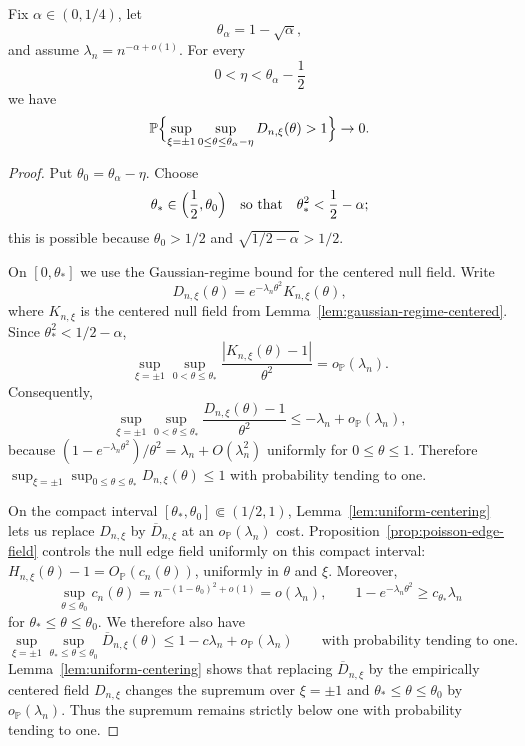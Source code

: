 \begin{lemma}
\label{lem:subthreshold-envelope}
Fix $\alpha\in(0,1/4)$, let
\[
    \theta_\alpha=1-\sqrt\alpha,
\]
and assume $\lambda_n=n^{-\alpha+o(1)}$. For every
\[
    0<\eta<\theta_\alpha-\frac12
\]
we have
\[
    \mathbb P\Bigl\{
        \sup_{\xi=\pm1}
        \sup_{0\le\theta\le\theta_\alpha-\eta}
        D_{n,\xi}(\theta)>1
    \Bigr\}\to0.
\]
\end{lemma}

\begin{proof}
Put $\theta_0=\theta_\alpha-\eta$. Choose
\[
    \theta_* \in
    \Bigl(\frac12,\theta_0\Bigr)
    \quad\text{so that}\quad
    \theta_*^2<\frac12-\alpha;
\]
this is possible because $\theta_0>1/2$ and $\sqrt{1/2-\alpha}>1/2$.

On $[0,\theta_*]$ we use the Gaussian-regime bound for the centered null field. Write
\[
    D_{n,\xi}(\theta)
    =
    e^{-\lambda_n\theta^2}K_{n,\xi}(\theta),
\]
where $K_{n,\xi}$ is the centered null field from Lemma~\ref{lem:gaussian-regime-centered}. Since $\theta_*^2<1/2-\alpha$,
\[
    \sup_{\xi=\pm1}\sup_{0<\theta\le\theta_*}
    \frac{|K_{n,\xi}(\theta)-1|}{\theta^2}
    =
    o_{\mathbb P}(\lambda_n).
\]
Consequently,
\[
    \sup_{\xi=\pm1}\sup_{0<\theta\le\theta_*}
    \frac{D_{n,\xi}(\theta)-1}{\theta^2}
    \le
    -\lambda_n+o_{\mathbb P}(\lambda_n),
\]
because $(1-e^{-\lambda_n\theta^2})/\theta^2=\lambda_n+O(\lambda_n^2)$ uniformly for $0\le\theta\le1$. Therefore $\sup_{\xi=\pm1}\sup_{0\le\theta\le\theta_*}D_{n,\xi}(\theta)\le1$ with probability tending to one.

On the compact interval $[\theta_*,\theta_0]\Subset(1/2,1)$, Lemma~\ref{lem:uniform-centering} lets us replace $D_{n,\xi}$ by $\overline D_{n,\xi}$ at an $o_{\mathbb P}(\lambda_n)$ cost. Proposition~\ref{prop:poisson-edge-field} controls the null edge field uniformly on this compact interval: \(H_{n,\xi}(\theta)-1=O_{\mathbb P}(c_n(\theta))\), uniformly in \(\theta\) and \(\xi\). Moreover,
\[
    \sup_{\theta\le\theta_0}c_n(\theta)
    =
    n^{-(1-\theta_0)^2+o(1)}
    =
    o(\lambda_n),
    \qquad
    1-e^{-\lambda_n\theta^2}
    \ge c_{\theta_*}\lambda_n
\]
for $\theta_*\le\theta\le\theta_0$. We therefore also have
\[
    \sup_{\xi=\pm1}\sup_{\theta_*\le\theta\le\theta_0}
    \overline D_{n,\xi}(\theta)
    \le
    1-c\lambda_n+o_{\mathbb P}(\lambda_n)
    \qquad\text{with probability tending to one}.
\]
Lemma~\ref{lem:uniform-centering} shows that replacing
\(\overline D_{n,\xi}\) by the empirically centered field
\(D_{n,\xi}\) changes the supremum over
\(\xi=\pm1\) and \(\theta_*\le\theta\le\theta_0\) by
\(o_{\mathbb P}(\lambda_n)\). Thus the supremum remains strictly below one
with probability tending to one. \qedhere
\end{proof}

